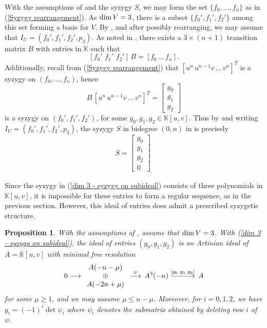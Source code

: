 \documentclass[reqno]{amsart}
\newtheorem{prop}[thm]{Proposition}
\numberwithin{equation}{section}
\theoremstyle{definition}
\def\K{\mathbb{K}}
\def\dim{\mathop{\rm dim}}
\DeclareRobustCommand{\longerrightarrow}{
\DOTSB\relbar\joinrel\relbar\joinrel\relbar\joinrel\relbar\joinrel\rightarrow
}
\begin{document}
With the assumptions of  and the syzygy $S$, we may form the set $\{f_0,\ldots,f_n\}$ as in (\ref{Syzygy rearrangement}). As $\dim V=3$, there is a subset $\{f_0',f_1',f_2'\}$ among this set forming a basis for $V$. By , and after possibly rearranging, we may assume that $I_U = (f_0',f_1',f_2',p_3)$. As noted in , there exists a $3\times (n+1)$ transition matrix $B$ with entries in $\K$ such that  
\begin{equation}\label{dim 3 transition matrix equation}
[f_0'\, \,f_1'\,\,f_2']\, B= [f_0\,\ldots\,f_n].
\end{equation}
Additionally, recall from (\ref{Syzygy rearrangement}) that  $[u^n\, u^{n-1}v\, \ldots \,v^n]^T$ is a syzygy on $(f_0,\ldots,f_n)$, hence
\begin{equation}\label{dim 3 - syzygy on subideal}
B\, [u^n\, u^{n-1}v\, \ldots \,v^n]^T = \begin{bmatrix}
    g_0\\
    g_1\\
    g_2
\end{bmatrix}    
\end{equation}
 is a syzygy on $(f_0',f_1',f_2')$, for some $g_0,g_1,g_2 \in \K[u,v]$. Thus by  and writing $I_U = (f_0',f_1',f_2',p_3)$, the syzygy $S$ in bidegree $(0,n)$ in  is precisely
\begin{equation}\label{dim 3 -- S defn}
    S=\begin{bmatrix}
    g_0\\
    g_1\\
    g_2\\
    0
\end{bmatrix}_.    
\end{equation}

Since the syzygy in (\ref{dim 3 - syzygy on subideal}) consists of three polynomials in $\K[u,v]$, it is impossible for these entries to form a regular sequence, as in the previous section. However, this ideal of entries does admit a prescribed syzygetic structure.

\begin{prop}\label{dim V = 3 - (g_0 g_1 g_2) Artinian so HB G2P}
    With the assumptions of , assume that $\dim V =3$. With (\ref{dim 3 - syzygy on subideal}), the ideal of entries $(g_0, g_1, g_2)$ is an Artinian ideal of $A=\K[u,v]$ with minimal free resolution
    \begin{equation}\label{dim 3 - res of (g0,g1,g2)}
 0 \longrightarrow \begin{array}{c}
 A(-n-\mu)\\
 \oplus \\
A(-2n+\mu)
\end{array} \overset{\psi}{\longrightarrow} \,
A^3(-n)\overset{[g_0\,\,g_1\,\,g_2]}{\longerrightarrow} \,
A
\end{equation}
for some $\mu\geq 1$, and we may assume $\mu\leq n-\mu$. Moreover, for $i=0,1,2$, we have $g_i = (-1)^i\det \psi_i$ where $\psi_i$ denotes the submatrix obtained by deleting row $i$ of $\psi$.
\end{prop}
\end{document}
